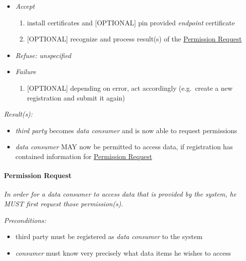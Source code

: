 \documentclass[12pt,english,a4paper,titlepage,cleardoublepage=empty,dottedtoc]{report}
\providecommand{\tightlist}{%
  \setlength{\itemsep}{0pt}\setlength{\parskip}{0pt}}
\begin{document}
\begin{enumerate}
  \begin{itemize}
  \item
    \emph{Accept}

    \begin{enumerate}
    \def\labelenumii{\arabic{enumii})}
    \tightlist
    \item
      install certificates and {[}OPTIONAL{]} pin provided
      \emph{endpoint} certificate
    \item
      {[}OPTIONAL{]} recognize and process result(s) of the
      \protect\hyperlink{-permission-request}{Permission Request}
    \end{enumerate}
  \item
    \emph{Refuse: unspecified}
  \item
    \emph{Failure}

    \begin{enumerate}
    \def\labelenumii{\arabic{enumii})}
    \tightlist
    \item
      {[}OPTIONAL{]} depending on error, act accordingly (e.g.~create a
      new registration and submit it again)
    \end{enumerate}
  \end{itemize}
\end{enumerate}

\emph{Result(s):}

\begin{itemize}
\tightlist
\item
  \emph{third party} becomes \emph{data consumer} and is now able to
  request permissions
\item
  \emph{data consumer} MAY now be permitted to access data, if
  registration has contained information for
  \protect\hyperlink{-permission-request}{Permission Request}
\end{itemize}

\newpage

\hypertarget{permission-request}{\paragraph{Permission
Request}\label{permission-request}}

\emph{In order for a data consumer to access data that is provided by
the system, he MUST first request those permission(s).}

\emph{Preconditions:}

\begin{itemize}
\tightlist
\item
  third party must be registered as \emph{data consumer} to the system
\item
  \emph{consumer} must know very precisely what data items he wishes to
  access
\end{itemize}
\end{document}
